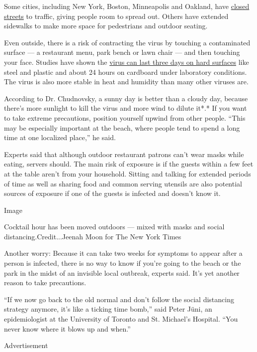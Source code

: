 Some cities, including New York, Boston, Minneapolis and Oakland, have
\href{https://www.nytimes3xbfgragh.onion/2020/04/11/us/coronavirus-street-closures.html}{closed
streets} to traffic, giving people room to spread out. Others have
extended sidewalks to make more space for pedestrians and outdoor
seating.

Even outside, there is a risk of contracting the virus by touching a
contaminated surface --- a restaurant menu, park bench or lawn chair ---
and then touching your face. Studies have shown the
\href{https://www.nytimes3xbfgragh.onion/2020/03/17/health/coronavirus-surfaces-aerosols.html}{virus
can last three days on hard surfaces} like steel and plastic and about
24 hours on cardboard under laboratory conditions. The virus is also
more stable in heat and humidity than many other viruses are.

According to Dr. Chudnovsky, a sunny day is better than a cloudy day,
because there's more sunlight to kill the virus and more wind to dilute
it*.* If you want to take extreme precautions, position yourself upwind
from other people. ``This may be especially important at the beach,
where people tend to spend a long time at one localized place,'' he
said.

Experts said that although outdoor restaurant patrons can't wear masks
while eating, servers should. The main risk of exposure is if the guests
within a few feet at the table aren't from your household. Sitting and
talking for extended periods of time as well as sharing food and common
serving utensils are also potential sources of exposure if one of the
guests is infected and doesn't know it.

Image

Cocktail hour has been moved outdoors --- mixed with masks and social
distancing.Credit...Jeenah Moon for The New York Times

Another worry: Because it can take two weeks for symptoms to appear
after a person is infected, there is no way to know if you're going to
the beach or the park in the midst of an invisible local outbreak,
experts said. It's yet another reason to take precautions.

``If we now go back to the old normal and don't follow the social
distancing strategy anymore, it's like a ticking time bomb,'' said Peter
Jüni, an epidemiologist at the University of Toronto and St. Michael's
Hospital. ``You never know where it blows up and when.''

Advertisement

